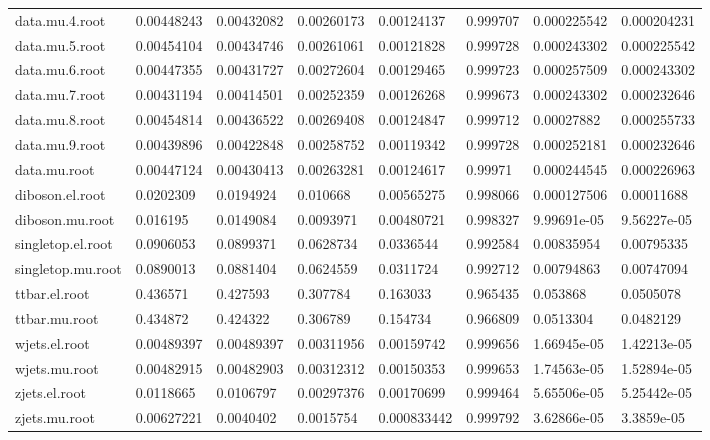 \begin{table}[]
\begin{tabular}{llllllll}
    data.mu.4.root     & 0.00448243 & 0.00432082 & 0.00260173 & 0.00124137  & 0.999707 & 0.000225542 & 0.000204231   \\
    data.mu.5.root     & 0.00454104 & 0.00434746 & 0.00261061 & 0.00121828  & 0.999728 & 0.000243302 & 0.000225542   \\
    data.mu.6.root     & 0.00447355 & 0.00431727 & 0.00272604 & 0.00129465  & 0.999723 & 0.000257509 & 0.000243302   \\
    data.mu.7.root     & 0.00431194 & 0.00414501 & 0.00252359 & 0.00126268  & 0.999673 & 0.000243302 & 0.000232646   \\
    data.mu.8.root     & 0.00454814 & 0.00436522 & 0.00269408 & 0.00124847  & 0.999712 & 0.00027882  & 0.000255733   \\
    data.mu.9.root     & 0.00439896 & 0.00422848 & 0.00258752 & 0.00119342  & 0.999728 & 0.000252181 & 0.000232646   \\
    data.mu.root       & 0.00447124 & 0.00430413 & 0.00263281 & 0.00124617  & 0.99971  & 0.000244545 & 0.000226963   \\
    diboson.el.root    & 0.0202309  & 0.0194924  & 0.010668   & 0.00565275  & 0.998066 & 0.000127506 & 0.00011688    \\
    diboson.mu.root    & 0.016195   & 0.0149084  & 0.0093971  & 0.00480721  & 0.998327 & 9.99691e-05 & 9.56227e-05   \\
    singletop.el.root  & 0.0906053  & 0.0899371  & 0.0628734  & 0.0336544   & 0.992584 & 0.00835954  & 0.00795335    \\
    singletop.mu.root  & 0.0890013  & 0.0881404  & 0.0624559  & 0.0311724   & 0.992712 & 0.00794863  & 0.00747094    \\
    ttbar.el.root      & 0.436571   & 0.427593   & 0.307784   & 0.163033    & 0.965435 & 0.053868    & 0.0505078     \\
    ttbar.mu.root      & 0.434872   & 0.424322   & 0.306789   & 0.154734    & 0.966809 & 0.0513304   & 0.0482129     \\
    wjets.el.root      & 0.00489397 & 0.00489397 & 0.00311956 & 0.00159742  & 0.999656 & 1.66945e-05 & 1.42213e-05   \\
    wjets.mu.root      & 0.00482915 & 0.00482903 & 0.00312312 & 0.00150353  & 0.999653 & 1.74563e-05 & 1.52894e-05   \\
    zjets.el.root      & 0.0118665  & 0.0106797  & 0.00297376 & 0.00170699  & 0.999464 & 5.65506e-05 & 5.25442e-05   \\
    zjets.mu.root      & 0.00627221 & 0.0040402  & 0.0015754  & 0.000833442 & 0.999792 & 3.62866e-05 & 3.3859e-05    \\

\end{tabular}
\end{table}
